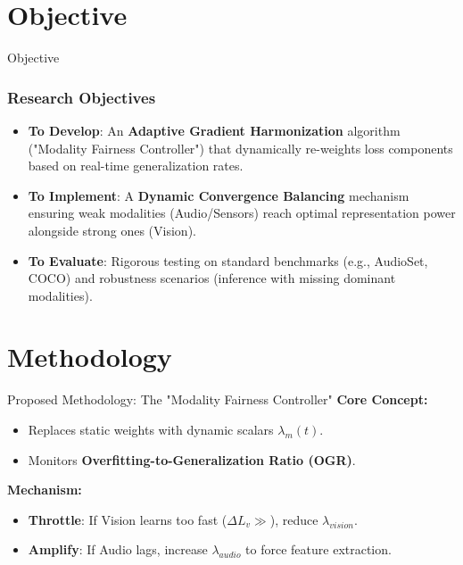 \documentclass[serif, aspectratio=169]{beamer}
\begin{document}
\section{Objective}
\begin{frame}{Objective}
    \frametitle<presentation>{Research Objectives}
    \begin{itemize}
        \item \justifying \textbf{To Develop}: An \textbf{Adaptive Gradient Harmonization} algorithm ("Modality Fairness Controller") that dynamically re-weights loss components based on real-time generalization rates.
        \item \justifying \textbf{To Implement}: A \textbf{Dynamic Convergence Balancing} mechanism ensuring weak modalities (Audio/Sensors) reach optimal representation power alongside strong ones (Vision).
        \item \justifying \textbf{To Evaluate}: Rigorous testing on standard benchmarks (e.g., AudioSet, COCO) and robustness scenarios (inference with missing dominant modalities).
    \end{itemize}
\end{frame}

\section{Methodology}
\begin{frame}{Proposed Methodology: The "Modality Fairness Controller"}
    \textbf{Core Concept:}
    \begin{itemize}
        \item Replaces static weights with dynamic scalars $\lambda_m(t)$.
        \item Monitors \textbf{Overfitting-to-Generalization Ratio (OGR)}.
    \end{itemize}
    \vspace{0.5cm}
    \textbf{Mechanism:}
    \begin{itemize}
        \item \textbf{Throttle}: If Vision learns too fast ($\Delta L_v \gg$), reduce $\lambda_{vision}$.
        \item \textbf{Amplify}: If Audio lags, increase $\lambda_{audio}$ to force feature extraction.
    \end{itemize}
\end{frame}
\end{document}
